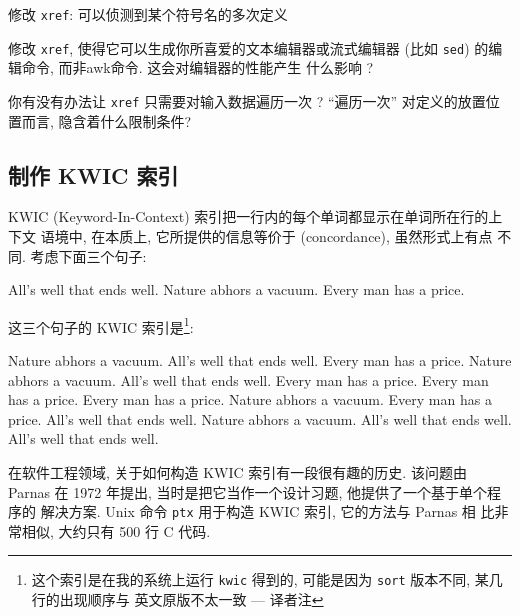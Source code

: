 \begin{exercise}
    \label{exer:xref}
    修改 \texttt{xref}: 可以侦测到某个符号名的多次定义
\end{exercise}

\begin{exercise}
    修改 \texttt{xref}, 使得它可以生成你所喜爱的文本编辑器或流式编辑器
    (比如 \texttt{sed}) 的编辑命令, 而非awk命令. 这会对编辑器的性能产生
    什么影响 ?
\end{exercise}

\begin{exercise}
    \label{exer:xref_once}
    你有没有办法让 \texttt{xref} 只需要对输入数据遍历一次 ? ``遍历一次''
    对定义的放置位置而言, 隐含着什么限制条件?
\end{exercise}

\subsection{制作 KWIC 索引}
\label{subsec:making_a_kwic_index}

KWIC (Keyword-In-Context) 索引把一行内的每个单词都显示在单词所在行的上下文
语境中, 在本质上, 它所提供的信息等价于  (concordance),
虽然形式上有点%
%
不同. 考虑下面三个句子:
\begin{awkcode}
    All's well that ends well.
    Nature abhors a vacuum.
    Every man has a price.
\end{awkcode}
这三个句子的 KWIC 索引是\footnote{这个索引是在我的系统上运行
\texttt{kwic} 得到的, 可能是因为 \texttt{sort} 版本不同, 某几行的出现顺序与
英文原版不太一致 --- 译者注}:
\begin{awkcode}
                        Nature  abhors a vacuum.
                                All's well that ends well.
                 Every man has  a price.
                 Nature abhors  a vacuum.
               All's well that  ends well.
                                Every man has a price.
                     Every man  has a price.
                         Every  man has a price.
                                Nature abhors a vacuum.
               Every man has a  price.
                    All's well  that ends well.
               Nature abhors a  vacuum.
          All's well that ends  well.
                         All's  well that ends well.
\end{awkcode}

在软件工程领域, 关于如何构造 KWIC 索引有一段很有趣的历史. 该问题由 Parnas 
在 1972 年提出, 当时是把它当作一个设计习题, 他提供了一个基于单个程序的
解决方案. Unix 命令 \texttt{ptx} 用于构造 KWIC 索引, 它的方法与 Parnas 相
比非常相似, 大约只有 500 行 C 代码.

